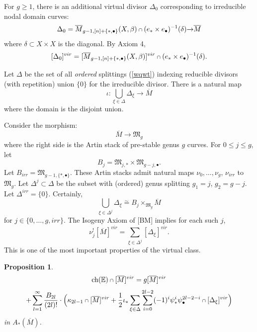 \documentclass[11 pt]{amsart}
\newtheorem{pr}{Proposition}
\newcommand{\rarr}{\rightarrow}
\newcommand{\eqq}{\stackrel{\sim}{=}}
\def\scap{\mathbin{\text{\scriptsize$\cap$}}}
\newcommand{\hodge}{\mathbb{E}}
\newcommand{\ch}{\text{ch}}
\begin{document}
For $g\geq 1$, there is an additional
virtual divisor $\Delta_0$ corresponding to irreducible
nodal domain curves:
$$\Delta_0 = \overline{M}_{g-1, [n]+\{*, \bullet\}}(X, \beta) \scap
(e_*\times e_\bullet)^{-1} (\delta) {\rarr} 
\overline{M}$$
where $\delta \subset X\times X$ is the diagonal.
By Axiom 4, 
$$[\Delta_0]^{vir} = [\overline{M}_{g-1, [n]+\{*,\bullet\}}(X, \beta)]^{vir} 
\scap (e_*\times e_\bullet)^{-1} (\delta).$$

Let $\Delta$ be the set of all {\em ordered} splittings (\ref{wqwt})
indexing reducible divisors (with repetition) union $\{ 0\}$
for the irreducible divisor. 
There is a natural map
$$\iota: \bigcup_{\xi \in \Delta} \Delta_\xi \rarr \overline{M}$$
where the domain is the disjoint union.


Consider the morphism:
$$\overline{M} \rarr \mathfrak{M}_g$$
where the right side is the Artin stack of pre-stable 
genus $g$ curves.
For $0\leq j \leq g$, let
$$B_j = \mathfrak{M}_{j,*} \times \mathfrak{M}_{g-j,\bullet}.$$
Let $B_{irr}= \mathfrak{M}_{g-1,\{*,\bullet\}}$.
These Artin stacks admit natural maps
$\nu_0, \ldots, \nu_g$, $\nu_{irr}$ to $\mathfrak{M}_g$.
Let $\Delta^j \subset \Delta$ be the
subset with (ordered) genus splitting $g_1=j$, $g_2=g-j$.
Let $\Delta^{irr}= \{0\}$.
Certainly, 
$$\bigcup_{\xi\in \Delta^j} \Delta_\xi \eqq  B_j\times
_{\mathfrak{M}_g} \overline{M} $$
for $j\in \{0, \ldots,g, irr\}$.
The Isogeny Axiom of [BM] implies for each such $j$,
\begin{equation}
\label{ewee}
\nu_j^{!} [\overline{M}]^{vir} = \sum_{\xi\in \Delta^j}
[\Delta_\xi]^{vir}.
\end{equation}
This is one of the most important properties of the virtual class.

\begin{pr} \label{hodg}
$$ \ch(\hodge) \scap [\overline{M}]^{vir} = g [\overline{M}]^{vir}$$
$$+ \sum_{l=1}^{\infty} \frac{ B_{2l}}{(2l)!}
\cdot \Big( \kappa_{2l-1} \scap [\overline{M}]^{vir}
+ \frac{1}{2} \iota_*\sum_{\xi \in \Delta}
\sum_{i=0}^{2l-2}
(-1)^i \psi_*^i \psi_\bullet^{2l-2-i} \scap [\Delta_\xi]^{vir}\Big)$$
in $A_*(\overline{M})$.
\end{pr}
\end{document}
